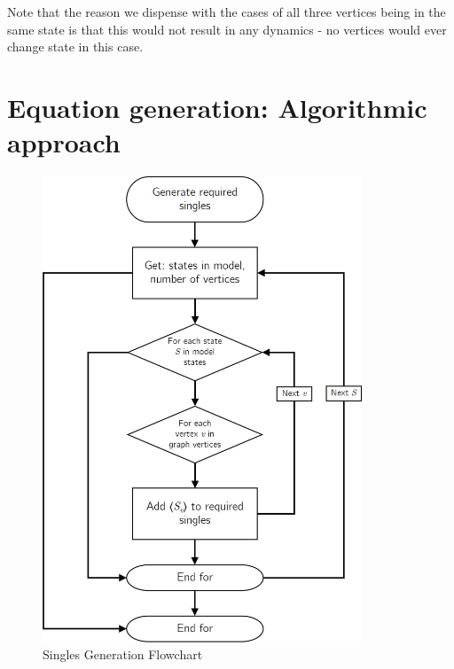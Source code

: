 \documentclass[12pt,a4paper]{article}
\begin{document}
Note that the reason we dispense with the cases of all three vertices being in the same state is that this would not result in any dynamics - no vertices would ever change state in this case. 

\newpage

\section{Equation generation: Algorithmic approach}

\begin{figure}[!ht]
\centering
     \includegraphics[width=0.85\textwidth]{Equations/GenerateSingles}
         \caption{Singles Generation Flowchart}
         \label{fig:gen-singles}
\end{figure}
\end{document}
